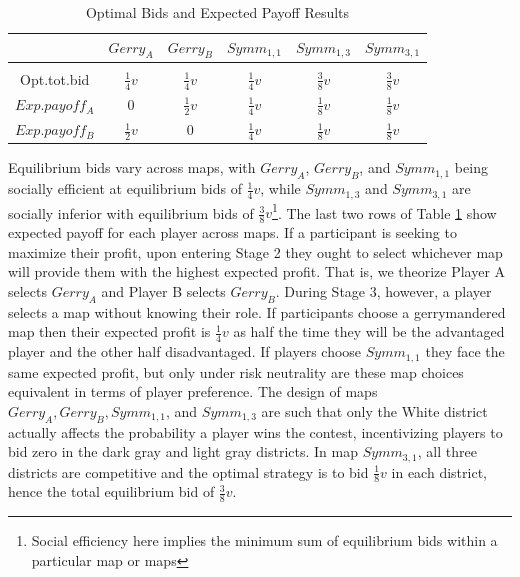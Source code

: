 \documentclass[AER]{AEA}
\begin{document}
\begin{table}[ht]
\caption{Optimal Bids and Expected Payoff Results} 
\centering 
\begin{tabular}{c c c c c c} 
\hline\hline 
 & $Gerry_A$ & $Gerry_B$ & $Symm_{1,1}$ & $Symm_{1,3}$ & $Symm_{3,1}$ \\ [0.5ex]
\hline \\[-1.8ex]
\vspace{0.2cm}
Opt.tot.bid & $\frac{1}{4}v$ & $\frac{1}{4}v$ & $\frac{1}{4}v$ & $\frac{3}{8}v$ & $\frac{3}{8}v$ \\
\vspace{0.2cm}
$Exp.payoff_A$ & 0 & $\frac{1}{2}v$ & $\frac{1}{4}v$ & $\frac{1}{8}v$ & $\frac{1}{8}v$ \\
$Exp.payoff_B$ & $\frac{1}{2}v$ & 0 & $\frac{1}{4}v$ & $\frac{1}{8}v$ & $\frac{1}{8}v$ \\ [1ex]
\hline 
\end{tabular}
\label{Tab:theory_predictions}
\end{table}

Equilibrium bids vary across maps, with $Gerry_A$, $Gerry_B$, and $Symm_{1,1}$ being socially efficient at equilibrium bids of $\frac{1}{4}v$, while $Symm_{1,3}$ and $Symm_{3,1}$ are socially inferior with equilibrium bids of $\frac{3}{8}v$\footnote{Social efficiency here implies the minimum sum of equilibrium bids within a particular map or maps}. The last two rows of Table \ref{Tab:theory_predictions} show expected payoff for each player across maps. If a participant is seeking to maximize their profit, upon entering Stage 2 they ought to select whichever map will provide them with the highest expected profit. That is, we theorize Player A selects $Gerry_A$ and Player B selects $Gerry_B$. During Stage 3, however, a player selects a map without knowing their role. If participants choose a gerrymandered map then their expected profit is $\frac{1}{4}v$ as half the time they will be the advantaged player and the other half disadvantaged. If players choose $Symm_{1,1}$ they face the same expected profit, but only under risk neutrality are these map choices equivalent in terms of player preference. The design of maps $Gerry_A, Gerry_B, Symm_{1,1}$, and $Symm_{1,3}$ are such that only the White district actually affects the probability a player wins the contest, incentivizing players to bid zero in the dark gray and light gray districts. In map $Symm_{3,1}$, all three districts are competitive and the optimal strategy is to bid $\frac{1}{8}v$ in each district, hence the total equilibrium bid of $\frac{3}{8}v$.
\end{document}
